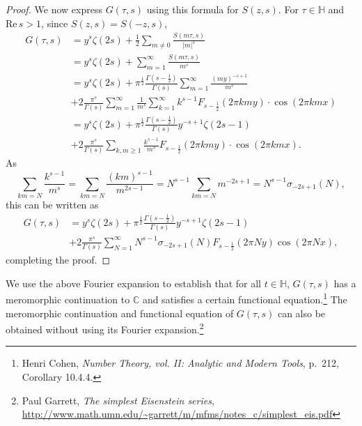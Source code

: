 \documentclass{article}
\def\Re{\ensuremath{\mathrm{Re}}\,}
\theoremstyle{definition}
\begin{document}
\begin{proof}
We now express $G(\tau,s)$ using this formula for $S(z,s)$.
For $\tau \in \mathbb{H}$
and $\Re s>1$, since $S(z,s)=S(-z,s)$,
\begin{align*}
G(\tau,s)&=y^s \zeta(2s) +\frac{1}{2}\sum_{m \neq 0} \frac{S(m\tau,s)}{|m|^s}\\
&=y^s \zeta(2s) + \sum_{m=1}^\infty \frac{S(m\tau,s)}{m^s}\\
&=y^s \zeta(2s) +\pi^{\frac{1}{2}} \frac{ \Gamma\left(s-\frac{1}{2}\right)}{\Gamma(s)} \sum_{m=1}^\infty \frac{(my)^{-s+1}}{m^s}\\
&+2 \frac{\pi^s}{\Gamma(s)} \sum_{m=1}^\infty \frac{1}{m^s} \sum_{k=1}^\infty k^{s-1} F_{s-\frac{1}{2}}(2\pi kmy) \cdot \cos(2\pi kmx)\\
&=y^s \zeta(2s)   +\pi^{\frac{1}{2}} \frac{ \Gamma\left(s-\frac{1}{2}\right)}{\Gamma(s)} y^{-s+1} \zeta(2s-1)\\
&+2 \frac{\pi^s}{\Gamma(s)} \sum_{k,m \geq 1} \frac{k^{s-1}}{m^s} F_{s-\frac{1}{2}}(2\pi kmy) \cdot \cos(2\pi kmx).
\end{align*}
As
\[
\sum_{km=N} \frac{k^{s-1}}{m^s} = \sum_{km=N} \frac{(km)^{s-1}}{m^{2s-1}} 
= N^{s-1} \sum_{km=N} m^{-2s+1}
=N^{s-1} \sigma_{-2s+1}(N),
\]
this can be written as
\begin{align*}
G(\tau,s)&=y^s \zeta(2s)   +\pi^{\frac{1}{2}} \frac{ \Gamma\left(s-\frac{1}{2}\right)}{\Gamma(s)} y^{-s+1} \zeta(2s-1)\\
&+2 \frac{\pi^s}{\Gamma(s)} \sum_{N=1}^\infty N^{s-1} \sigma_{-2s+1}(N) F_{s-\frac{1}{2}}(2\pi Ny) \cos(2\pi Nx),
\end{align*}
completing the proof.
\end{proof}




We use the above Fourier expansion to establish that for all $t \in \mathbb{H}$, $G(\tau,s)$ 
has a meromorphic continuation
to $\mathbb{C}$ and
satisfies a certain functional equation.\footnote{Henri Cohen, {\em Number Theory, vol. II: Analytic and Modern Tools}, p.~212, Corollary 10.4.4.}
The meromorphic continuation and functional equation of $G(\tau,s)$ can also be obtained without using its Fourier expansion.\footnote{Paul Garrett, {\em The simplest Eisenstein series},
\url{http://www.math.umn.edu/~garrett/m/mfms/notes_c/simplest_eis.pdf}}
\end{document}
